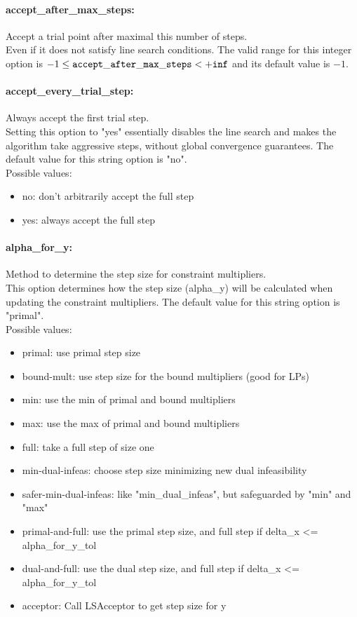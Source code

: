 \paragraph{accept\_after\_max\_steps:}\label{opt:accept_after_max_steps} Accept a trial point after maximal this number of steps. \\
 Even if it does not satisfy line search conditions. The valid range for this integer option is
$-1 \le {\tt accept\_after\_max\_steps } <  {\tt +inf}$
and its default value is $-1$.


\paragraph{accept\_every\_trial\_step:}\label{opt:accept_every_trial_step} Always accept the first trial step. \\
 Setting this option to "yes" essentially disables the line search and makes the algorithm take aggressive steps, without global convergence guarantees. The default value for this string option is "no".
\\ 
Possible values:
\begin{itemize}
   \item no: don't arbitrarily accept the full step
   \item yes: always accept the full step
\end{itemize}

\paragraph{alpha\_for\_y:}\label{opt:alpha_for_y} Method to determine the step size for constraint multipliers. \\
 This option determines how the step size (alpha\_y) will be calculated when updating the constraint multipliers. The default value for this string option is "primal".
\\ 
Possible values:
\begin{itemize}
   \item primal: use primal step size
   \item bound-mult: use step size for the bound multipliers (good for LPs)
   \item min: use the min of primal and bound multipliers
   \item max: use the max of primal and bound multipliers
   \item full: take a full step of size one
   \item min-dual-infeas: choose step size minimizing new dual infeasibility
   \item safer-min-dual-infeas: like "min\_dual\_infeas", but safeguarded by "min" and "max"
   \item primal-and-full: use the primal step size, and full step if delta\_x <= alpha\_for\_y\_tol
   \item dual-and-full: use the dual step size, and full step if delta\_x <= alpha\_for\_y\_tol
   \item acceptor: Call LSAcceptor to get step size for y
\end{itemize}

